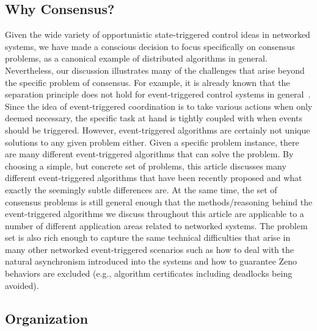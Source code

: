 \documentclass{autart}
\begin{document}
\subsection*{Why Consensus?}


Given the wide variety of opportunistic state-triggered control ideas
in networked systems, we have made a conscious decision to focus
specifically on consensus problems, as a canonical example of
distributed algorithms in general. Nevertheless, our discussion
illustrates many of the challenges that arise beyond the specific
problem of consensus.  For example, it is already known that the
separation principle does not hold for event-triggered control systems
in general~\citep{CR-HS-LB-KHJ:11}.  Since the idea of event-triggered
coordination is to take various actions when only deemed necessary,
the specific task at hand is tightly coupled with when events should
be triggered. However, event-triggered algorithms are certainly not
unique solutions to any given problem either. Given a specific problem
instance, there are many different event-triggered algorithms that can
solve the problem.  By choosing a simple, but concrete set of
problems, this article discusses many different event-triggered
algorithms that have been recently proposed and what exactly the
seemingly subtle differences are. At the same time, the set of
consensus problems is still general enough that the methods/reasoning
behind the event-triggered algorithms we discuss throughout this
article are applicable to a number of different application areas
related to networked systems. The problem set is also rich enough to
capture the same technical difficulties that arise in many other
networked event-triggered scenarios such as how to deal with the
natural asynchronism introduced into the systems and how to guarantee
Zeno behaviors are excluded (e.g., algorithm certificates including
deadlocks being avoided).


\subsection*{Organization}
\end{document}
